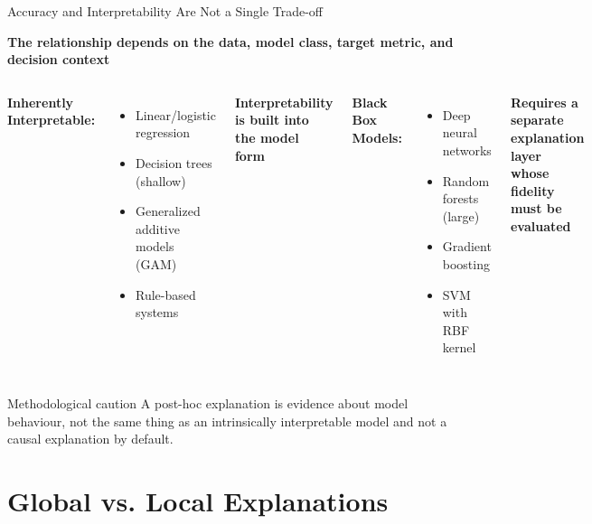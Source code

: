 \documentclass[aspectratio=169]{beamer}
\begin{document}
\begin{frame}{Accuracy and Interpretability Are Not a Single Trade-off}
  \begin{center}
    \textbf{The relationship depends on the data, model class, target metric, and decision context}
  \end{center}

  \vspace{0.5em}

  \begin{columns}
    \textbf{Inherently Interpretable:}
    \begin{itemize}
      \item Linear/logistic regression
      \item Decision trees (shallow)
      \item Generalized additive models (GAM)
      \item Rule-based systems
    \end{itemize}

    \textcolor{ESMADBlue}{\textbf{Interpretability is built into the model form}}

    \textbf{Black Box Models:}
    \begin{itemize}
      \item Deep neural networks
      \item Random forests (large)
      \item Gradient boosting
      \item SVM with RBF kernel
    \end{itemize}

    \textcolor{ESMADAccent}{\textbf{Requires a separate explanation layer whose fidelity must be evaluated}}
  \end{columns}

  \vspace{1em}

  \begin{block}{Methodological caution}
    A post-hoc explanation is evidence about model behaviour, not the same thing as an intrinsically interpretable model and not a causal explanation by default.
  \end{block}
\end{frame}

\section{Global vs. Local Explanations}
\end{document}
